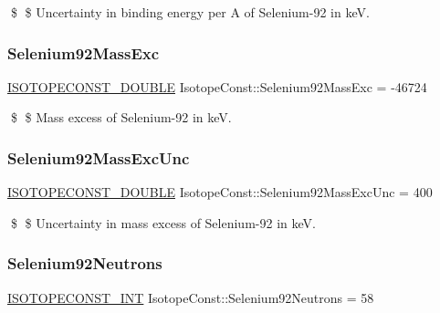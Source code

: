 \$ \$ Uncertainty in binding energy per A of Selenium-\/92 in keV. \mbox{\label{group___isotope_const-_selenium-_se92_ga4f50ae79b3aa28dcf41e519784092574}} 
\subsubsection{\texorpdfstring{Selenium92\+Mass\+Exc}{Selenium92MassExc}}
{\footnotesize\ttfamily \mbox{\hyperlink{group___isotope_const-_macros_ga8f45a7272ce02c0b4c65c44636ed719a}{I\+S\+O\+T\+O\+P\+E\+C\+O\+N\+S\+T\+\_\+\+D\+O\+U\+B\+LE}} Isotope\+Const\+::\+Selenium92\+Mass\+Exc = -\/46724}

\$ \$ Mass excess of Selenium-\/92 in keV. \mbox{\label{group___isotope_const-_selenium-_se92_ga73cae0c6e8611059b3af2f4633fac6d7}} 
\subsubsection{\texorpdfstring{Selenium92\+Mass\+Exc\+Unc}{Selenium92MassExcUnc}}
{\footnotesize\ttfamily \mbox{\hyperlink{group___isotope_const-_macros_ga8f45a7272ce02c0b4c65c44636ed719a}{I\+S\+O\+T\+O\+P\+E\+C\+O\+N\+S\+T\+\_\+\+D\+O\+U\+B\+LE}} Isotope\+Const\+::\+Selenium92\+Mass\+Exc\+Unc = 400}

\$ \$ Uncertainty in mass excess of Selenium-\/92 in keV. \mbox{\label{group___isotope_const-_selenium-_se92_ga107d35fa82d626f1ff6c3620ce74a6e6}} 
\subsubsection{\texorpdfstring{Selenium92\+Neutrons}{Selenium92Neutrons}}
{\footnotesize\ttfamily \mbox{\hyperlink{group___isotope_const-_macros_ga5f18360b3e99483a35c32d789e62621c}{I\+S\+O\+T\+O\+P\+E\+C\+O\+N\+S\+T\+\_\+\+I\+NT}} Isotope\+Const\+::\+Selenium92\+Neutrons = 58}

